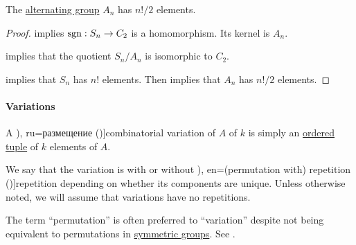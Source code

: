\begin{proposition}\label{thm:alternating_group_cardinality}
  The \hyperref[def:alternating_group]{alternating group} \( A_n \) has \( n! / 2 \) elements.
\end{proposition}
\begin{proof}
   implies \( \operatorname{sgn}: S_n \to C_2 \) is a homomorphism. Its kernel is \( A_n \).

   implies that the quotient \( S_n / A_n \) is isomorphic to \( C_2 \).

   implies that \( S_n \) has \( n! \) elements. Then  implies that \( A_n \) has \( n! / 2 \) elements.
\end{proof}

\paragraph{Variations}

\begin{definition}\label{def:combinatorial_variation}\mimprovised
  A \term[bg=вариация (\cite[27]{ДимитровЯнев2007Статистика}), ru=размещение (\cite[171]{Яблонский2003ДискретнаяМатематика})]{combinatorial variation} of \( A \) of  \( k \) is simply an \hyperref[def:ordered_tuple]{ordered tuple} of \( k \) elements of \( A \).

  We say that the variation is with or without \term[bg=(вариация с) повторение (\cite[27]{ДимитровЯнев2007Статистика}), en=(permutation with) repetition (\cite[446]{Rosen2019DiscreteMathematics})]{repetition} depending on whether its components are unique. Unless otherwise noted, we will assume that variations have no repetitions.
\end{definition}
\begin{comments}
  \item The term \enquote{permutation} is often preferred to \enquote{variation} despite not being equivalent to permutations in \hyperref[def:symmetric_group]{symmetric groups}. See .
\end{comments}

